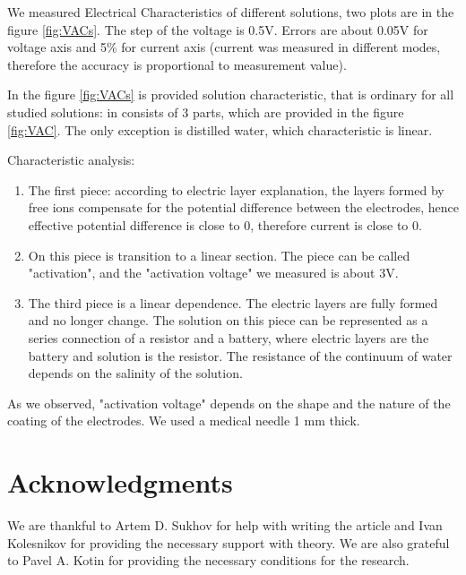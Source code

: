 \documentclass{article}
\begin{document}
We measured Electrical Characteristics of different solutions, two plots are in the figure \ref{fig:VACs}. The step of the voltage is 0.5V. Errors are about 0.05V for voltage axis and 5\% for current axis (current was measured in different modes, therefore the accuracy is proportional to measurement value).


In the figure \ref{fig:VACs} is provided solution characteristic, that is ordinary for all studied solutions: in consists of 3 parts, which are provided in the figure \ref{fig:VAC}. The only exception is distilled water, which characteristic is linear.

Characteristic analysis:
\begin{enumerate}   
\item The first piece: according to electric layer explanation, the layers formed by free ions compensate for the potential difference between the electrodes, hence effective potential difference is close to 0, therefore current is close to 0.

\item On this piece is transition to a linear section. The piece can be called "activation", and the "activation voltage" we measured is about 3V.

\item The third piece is a linear dependence. The electric layers are fully formed and no longer change. The solution on this piece can be represented as a series connection of a resistor and a battery, where electric layers are the battery and solution is the resistor. The resistance of the continuum of water depends on the salinity of the solution.
\end{enumerate}

As we observed, "activation voltage" depends on the shape and the nature of the coating of the electrodes. We used a medical needle 1 mm thick.



\section{Acknowledgments}
We are thankful to Artem D. Sukhov for help with writing the article and Ivan Kolesnikov for providing the necessary support with theory. We are also grateful to Pavel A. Kotin for providing the necessary conditions for the research.



\end{document}

